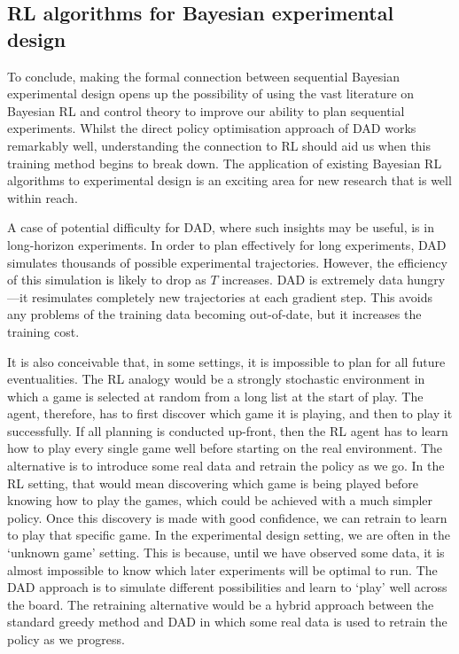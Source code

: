 \documentclass[a4paper, 10pt]{report}
\theoremstyle{plain}
\begin{document}
	\subsection{RL algorithms for Bayesian experimental design}
	To conclude, making the formal connection between sequential Bayesian experimental design opens up the possibility of using the vast literature on Bayesian RL and control theory to improve our ability to plan sequential experiments.
	Whilst the direct policy optimisation approach of DAD works remarkably well, understanding the connection to RL should aid us when this training method begins to break down.
	The application of existing Bayesian RL algorithms to experimental design is an exciting area for new research that is well within reach.
	
	A case of potential difficulty for DAD, where such insights may be useful, is in long-horizon experiments. 
	In order to plan effectively for long experiments, DAD simulates thousands of possible experimental trajectories.
	However, the efficiency of this simulation is likely to drop as $T$ increases.
	DAD is extremely data hungry---it resimulates completely new trajectories at each gradient step.
	This avoids any problems of the training data becoming out-of-date, but it increases the training cost.
	
	
	It is also conceivable that, in some settings, it is impossible to plan for all future eventualities.
	The RL analogy would be a strongly stochastic environment in which a game is selected at random from a long list at the start of play.
	The agent, therefore, has to first discover which game it is playing, and then to play it successfully.
	If all planning is conducted up-front, then the RL agent has to learn how to play every single game well before starting on the real environment.
	The alternative is to introduce some real data and retrain the policy as we go.
	In the RL setting, that would mean discovering which game is being played before knowing how to play the games, which could be achieved with a much simpler policy.
	Once this discovery is made with good confidence, we can retrain to learn to play that specific game.
	In the experimental design setting, we are often in the `unknown game' setting. 
	This is because, until we have observed some data, it is almost impossible to know which later experiments will be optimal to run.
	The DAD approach is to simulate different possibilities and learn to `play' well across the board.
	The retraining alternative would be a hybrid approach between the standard greedy method and DAD in which some real data is used to retrain the policy as we progress.
\end{document}
